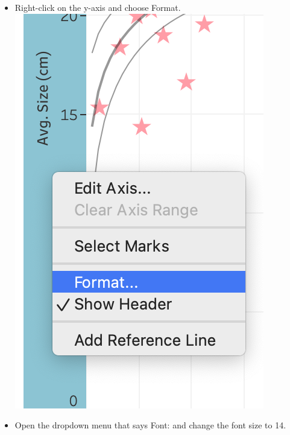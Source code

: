 \documentclass[
]{book}
\begin{document}
\begin{enumerate}
  \begin{itemize}
  \item
    Right-click on the y-axis and choose Format.
    \includegraphics{images/M3S2_format-axis.png}
  \item
    Open the dropdown menu that says Font: and change the font size to 14.

\end{itemize}
\end{enumerate}
\end{document}

